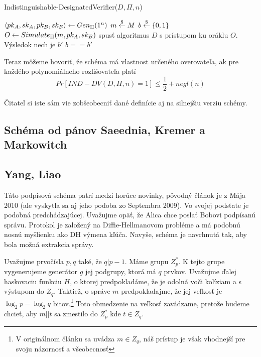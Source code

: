 \begin{procedure}[H]
    \caption{Indistinguishable-DesignatedVerifier($D,\Pi,n$)}
    \label{proc:ind-dv}
    $\langle pk_A,sk_A,pk_B,sk_B \rangle \leftarrow Gen_{\Pi}(1^n)$ \;
    $m \overset{\$}{\leftarrow} M$ \;
    $b \overset{\$}{\leftarrow} \{0,1\}$ \;
        {$O \leftarrow Simulate_\Pi(m,pk_A,sk_B)$}
    spusť algoritmus $D$ s prístupom ku oráklu $O$. Výsledok nech je
    $b'$ \;
    \Return $b==b'$\;
\end{procedure}

Teraz môžeme hovoriť, že schéma má vlastnost určeného overovateľa, ak
pre každého polynomiálneho rozlišovateľa platí
\begin{equation*}
    Pr[IND-DV(D,\Pi,n)=1] \le \frac{1}{2} + negl(n)
\end{equation*}

Čitateľ si iste sám vie zobšeobecniť dané definície aj na silnejšiu
verziu schémy.

\subsection{Schéma od pánov Saeednia, Kremer a Markowitch}
\todo{}
\cite{designated_verifier}


\subsection{Yang, Liao}
Táto podpisová schéma patrí medzi horúce novinky, pôvodný článok
\cite{designated_verifier2}
je z Mája 2010 (ale vyskytla sa aj jeho podoba zo Septembra 2009).
Vo svojej podstate je podobná predchádzajúcej.
Uvažujme opäť, že Alica chce poslať Bobovi podpísanú správu.
Protokol je založený na Diffie-Hellmanovom probléme a má podobnú nosnú
myšlienku ako DH výmena kľúča.
Navyše, schéma je navrhnutá tak, aby bola možná extrakcia správy.

Uvažujme prvočísla $p,q$ také, že $q | p-1$. 
Máme grupu $Z_p^*$.
K tejto grupe vygenerujeme generátor $g$ jej podgrupy, ktorá má $q$
prvkov. Uvažujme ďalej haskovaciu funkciu $H$, o ktorej predpokladáme,
že je odolná voči kolíziam a s výstupom do $Z_q$. Taktiež, o správe
$m$ predpokladajme, že jej veľkosť je $\log_2 p - \log_2 q$
bitov.\footnote{V originálnom článku sa uvádza $m\in Z_q$,
    náš prístup je však vhodnejší pre svoju názornosť a všeobecnosť}
Toto obmedzenie na veľkosť zavádzame, pretože budeme chcieť, aby
$m||t$ sa zmestilo do $Z_p^*$ kde $t \in Z_q$.

